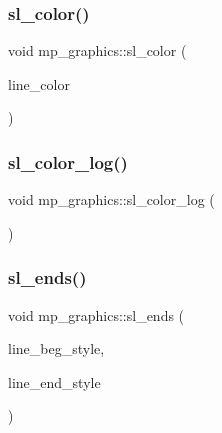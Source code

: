 \subsubsection{\texorpdfstring{sl\+\_\+color()}{sl\_color()}}
{\footnotesize\ttfamily void mp\+\_\+graphics\+::sl\+\_\+color (\begin{DoxyParamCaption}\item[{\mbox{\hyperlink{galois_8h_a09fddde158a3a20bd2dcadb609de11dc}{I\+NT}}}]{line\+\_\+color }\end{DoxyParamCaption})}

\mbox{\label{classmp__graphics_a0175960232b3ad314ea4763ea3470c83}} 
\subsubsection{\texorpdfstring{sl\+\_\+color\+\_\+log()}{sl\_color\_log()}}
{\footnotesize\ttfamily void mp\+\_\+graphics\+::sl\+\_\+color\+\_\+log (\begin{DoxyParamCaption}{ }\end{DoxyParamCaption})}

\mbox{\label{classmp__graphics_a555d8a360035bd043aedba1563107551}} 
\subsubsection{\texorpdfstring{sl\+\_\+ends()}{sl\_ends()}}
{\footnotesize\ttfamily void mp\+\_\+graphics\+::sl\+\_\+ends (\begin{DoxyParamCaption}\item[{\mbox{\hyperlink{galois_8h_a09fddde158a3a20bd2dcadb609de11dc}{I\+NT}}}]{line\+\_\+beg\+\_\+style,  }\item[{\mbox{\hyperlink{galois_8h_a09fddde158a3a20bd2dcadb609de11dc}{I\+NT}}}]{line\+\_\+end\+\_\+style }\end{DoxyParamCaption})}

\mbox{\label{classmp__graphics_af3c7852b230527041002aac41b8481fd}} 
